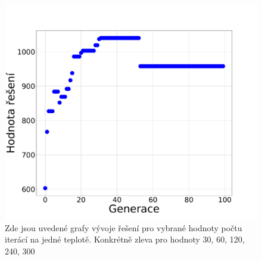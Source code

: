 \documentclass[11pt]{article}
\begin{document}
\begin{figure}
\begin{minipage}[c]{0.49\textwidth}
        \centering \includegraphics[width=\textwidth]{img/1w.pdf} 
    \end{minipage}
   \caption{Zde jsou uvedené grafy vývoje řešení pro vybrané hodnoty počtu iterácí na jedné teplotě. Konkrétně zleva pro hodnoty 30, 60, 120, 240, 300}\label{fig:GVPT}
\end{figure} 
\end{document}
